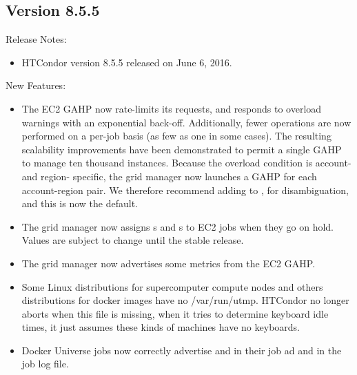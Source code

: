 \subsection*{\label{sec:New-8-5-5}Version 8.5.5}

\noindent Release Notes:

\begin{itemize}

\item HTCondor version 8.5.5 released on June 6, 2016.

\end{itemize}


\noindent New Features:

\begin{itemize}

\item The EC2 GAHP now rate-limits its requests, and responds to overload
warnings with an exponential back-off.  Additionally, fewer operations are
now performed on a per-job basis (as few as one in some cases).  The
resulting scalability improvements have been demonstrated to permit a single
GAHP to manage ten thousand instances.  Because the overload condition is
account- and region- specific, the grid manager now launches a GAHP for
each account-region pair.  We therefore recommend adding  to
, for disambiguation, and this is now the default.

\item The grid manager now assigns s and
s to EC2 jobs when they go on hold.  Values are
subject to change until the stable release.

\item The grid manager now advertises some metrics from the EC2 GAHP.

\item Some Linux distributions for supercomputer compute nodes and
others distributions for docker images have no /var/run/utmp. HTCondor no longer
aborts when this file is missing, when it tries to determine keyboard
idle times, it just assumes these kinds of machines have no keyboards.

\item Docker Universe jobs now correctly advertise 
and  in their job ad and in the job log file.


\end{itemize}
